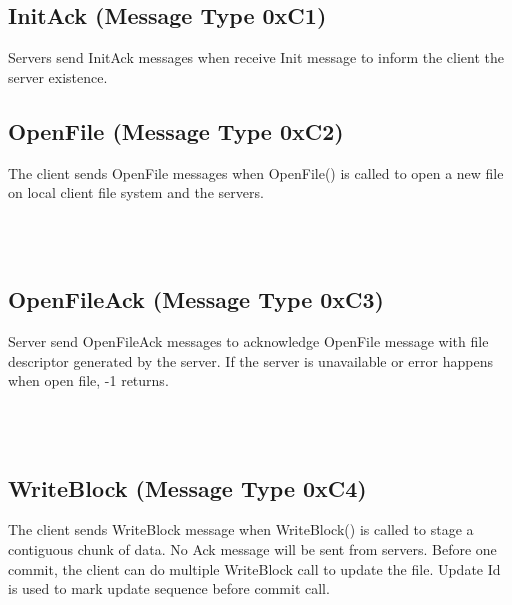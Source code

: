 \documentclass[12pt,fleqn]{article}
\begin{document}
\subsection{InitAck (Message Type 0xC1)}
Servers send InitAck messages when receive Init message to inform the client the server existence.

\subsection{OpenFile (Message Type 0xC2)}
The client sends OpenFile messages when OpenFile() is called to open a new file on local client file system and the servers.

\begin{center}
	\begin{bytefield}[bitwidth=1.1em]{16}
		 \\
		 \\
	\end{bytefield}
\end{center}

\subsection{OpenFileAck (Message Type 0xC3)}
Server send OpenFileAck messages to acknowledge OpenFile message with file descriptor generated by the server. If the server is unavailable or error happens when open file, -1 returns.

\begin{center}
	\begin{bytefield}[bitwidth=1.1em]{16}
		 \\
		 \\
	\end{bytefield}
\end{center}

\subsection{WriteBlock (Message Type 0xC4)}
The client sends WriteBlock message when WriteBlock() is called to stage a contiguous chunk of data. No Ack message will be sent from servers. Before one commit, the client can do multiple WriteBlock call to update the file. Update Id is used to mark update sequence before commit call.
\end{document}

